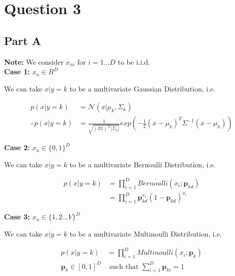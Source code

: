 \documentclass{article}
\begin{document}
\section*{Question 3}
\begin{addmargin}{1.5em}

    \subsection*{Part A}
    \begin{addmargin}{1.5em}
        
            \textbf{Note:} We consider $x_{ni}$ for $i = {1 ... D}$ to be i.i.d. \\
            
            \textbf{Case 1:} $x_n \in R^D$
            
            We can take $x | y = k$ to be a multivariate Gaussian Distribution, i.e.
            
            \begin{align*}
                p(x | y = k)            &= \mathcal{N}(x | \mu_k, \Sigma_k) \\
                \therefore p(x | y = k) &= \frac{1}{\sqrt{(2 \pi)^{D} |\Sigma_k|}}exp(-\frac{1}{2}(x - \mu_k)^T\Sigma^{-1}(x - \mu_k))
            \end{align*}
            
            \textbf{Case 2:} $x_n \in \{0, 1\}^D$
            
            We can take $x | y = k$ to be a multivariate Bernoulli Distribution, i.e.
            
            \begin{align*}
                p(x | y = k) &= \prod_{i = 1}^{D} Bernoulli(x_i; \boldsymbol{p}_{kd}) \\
                             &= \prod_{i = 1}^{D} \boldsymbol{p}_{kd}^{x_i}(1 - \boldsymbol{p}_{kd})^{x_i}
            \end{align*}
            
            \textbf{Case 3:} $x_n \in \{1, 2 ... V\}^D$
            
            We can take $x | y = k$ to be a multivariate Multinoulli Distribution, i.e.
            
            \begin{align*}
                p(x | y = k) &= \prod_{i = 1}^{D} Multinoulli(x_i; \boldsymbol{p}_k) \\
                \boldsymbol{p}_k \in [0, 1]^D &\text{ such that } \sum_{i = 1}^{D} \boldsymbol{p}_{ki} = 1
            \end{align*}
        

\end{addmargin}
\end{addmargin}
\end{document}
